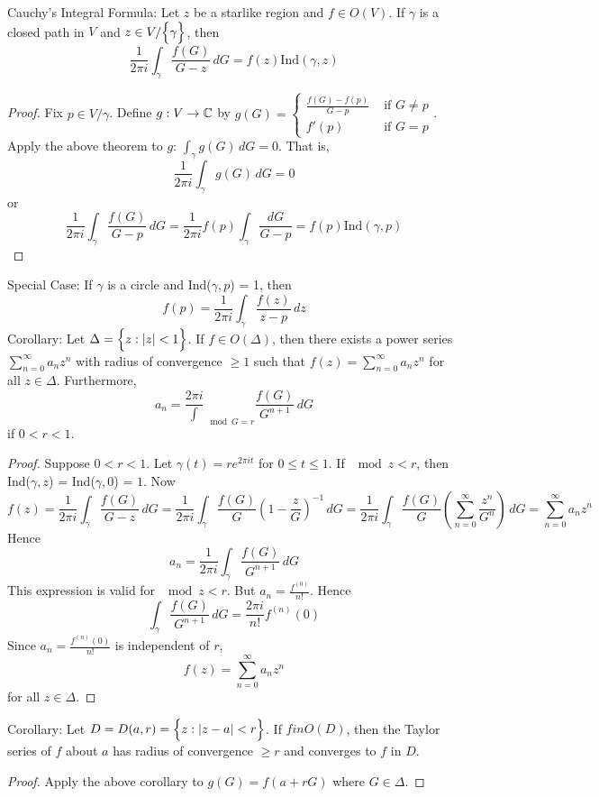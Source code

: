 \documentclass[12pt]{article}
\begin{document}
\begin{theorem} Cauchy's Integral Formula: Let $z$ be a starlike region and $f \in O(V)$. If $\gamma$ is a closed path in $V$ and $z \in V/\Big\{ \gamma \Big\}$, then $$ \frac{1}{2\pi i} \int_\gamma \frac{f(G)}{G -z} \, dG = f(z)\text{Ind}(\gamma,z) $$ \end{theorem} 
\begin{proof} Fix $p \in V/\gamma$. Define $g: V \to \mathbb{C}$ by $g(G) = \begin{cases} \frac{f(G) - f(p)}{G-p} &\text{ if } G \neq p \\ f'(p) &\text{ if } G = p \end{cases} $. Apply the above theorem to $g$: $\int_\gamma g(G) \, dG = 0$. That is, $$ \frac{1}{2\pi i} \int_\gamma g(G) \, dG = 0 $$ or $$ \frac{1}{2\pi i} \int_\gamma \frac{f(G)}{G-p} \, dG = \frac{1}{2\pi i} f(p) \int_\gamma \frac{dG}{G-p} = f(p)\text{Ind}(\gamma, p) $$ \end{proof} 
Special Case: If $\gamma$ is a circle and Ind($\gamma,p$) = 1, then $$ f(p) = \frac{1}{2\pi i} \int_\gamma \frac{f(z)}{z-p} \, dz $$ 
Corollary: Let $\Delta = \Big\{ z: \abs{z} < 1 \Big\}$. If $f \in O(\Delta)$, then there exists a power series $\sum_{n=0}^\infty a_nz^n$ with radius of convergence $\geq 1$ such that $f(z) = \sum_{n=0}^\infty a_nz^n$ for all $z \in \Delta$. Furthermore, $$a_n = \frac{2\pi i} \int_{\mod{G} = r} \frac{f(G)}{G^{n+1}} \, dG $$ if $0 < r < 1$. 
\begin{proof} Suppose $0 < r < 1$. Let $\gamma(t) = re^{2\pi i t}$ for $0 \leq t \leq 1$. If $\mod{z} < r$, then Ind($\gamma,z$) = Ind($\gamma,0$) = $1$. Now $$f(z) = \frac{1}{2\pi i} \int_\gamma \frac{f(G)}{G-z} \, dG = \frac{1}{2\pi i} \int_\gamma \frac{f(G)}{G} (1 - \frac{z}{G})^{-1} \, dG = \frac{1}{2\pi i} \int_\gamma \frac{f(G)}{G} (\sum_{n=0}^\infty \frac{z^n}{G^n}) \, dG = \sum_{n=0}^\infty a_nz^n $$ Hence $$a_n = \frac{1}{2\pi i} \int_\gamma \frac{f(G)}{G^{n+1}} \, dG $$ This expression is valid for $\mod{z} < r$. But $a_n = \frac{f^{(0)}}{n!}$. Hence $$ \int_\gamma \frac{f(G)}{G^{n+1}} \, dG = \frac{2\pi i}{n!} f^{(n)}(0) $$ Since $a_n= \frac{f^{(n)}(0)}{n!}$ is independent of $r$, $$ f(z) = \sum_{n=0}^\infty a_nz^n$$ for all $z \in \Delta$. \end{proof} 
Corollary: Let $D = D(a,r) = \Big\{ z: \abs{z-a} < r \Big\}$. If $f in O(D)$, then the Taylor series of $f$ about $a$ has radius of convergence $\geq r$ and converges to $f$ in $D$. 
\begin{proof} Apply the above corollary to $g(G) = f(a + rG)$ where $G \in \Delta$. \end{proof} 
\end{document}
